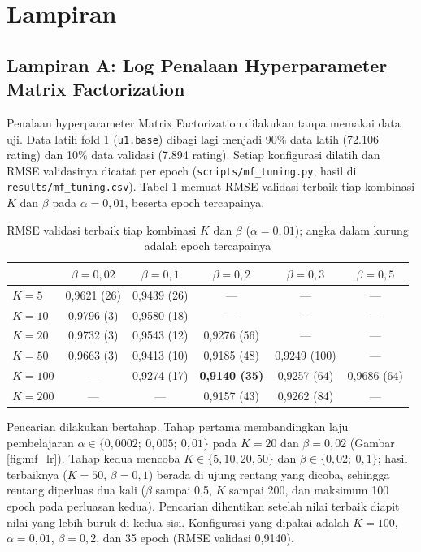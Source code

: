 \chapter*{Lampiran}
\section*{Lampiran A: Log Penalaan Hyperparameter Matrix Factorization}

Penalaan hyperparameter Matrix Factorization dilakukan tanpa memakai data uji. Data latih fold 1 (\texttt{u1.base}) dibagi lagi menjadi 90\% data latih (72.106 rating) dan 10\% data validasi (7.894 rating). Setiap konfigurasi dilatih dan RMSE validasinya dicatat per epoch (\texttt{scripts/mf\_tuning.py}, hasil di \texttt{results/mf\_tuning.csv}). Tabel \ref{tab:lampiran_tuning} memuat RMSE validasi terbaik tiap kombinasi $K$ dan $\beta$ pada $\alpha = 0,01$, beserta epoch tercapainya.

\begin{table}[htbp]
\centering
\caption{RMSE validasi terbaik tiap kombinasi $K$ dan $\beta$ ($\alpha = 0,01$); angka dalam kurung adalah epoch tercapainya}
\label{tab:lampiran_tuning}
\footnotesize
\setlength{\tabcolsep}{4pt}
\begin{tabular}{l c c c c c}
\toprule
 & $\beta = 0,02$ & $\beta = 0,1$ & $\beta = 0,2$ & $\beta = 0,3$ & $\beta = 0,5$ \\
\midrule
$K = 5$   & 0,9621 (26) & 0,9439 (26) & --- & --- & --- \\
$K = 10$  & 0,9796 (3)  & 0,9580 (18) & --- & --- & --- \\
$K = 20$  & 0,9732 (3)  & 0,9543 (12) & 0,9276 (56) & --- & --- \\
$K = 50$  & 0,9663 (3)  & 0,9413 (10) & 0,9185 (48) & 0,9249 (100) & --- \\
$K = 100$ & ---         & 0,9274 (17) & \textbf{0,9140 (35)} & 0,9257 (64) & 0,9686 (64) \\
$K = 200$ & ---         & ---         & 0,9157 (43) & 0,9262 (84) & --- \\
\bottomrule
\end{tabular}
\end{table}

Pencarian dilakukan bertahap. Tahap pertama membandingkan laju pembelajaran $\alpha \in \{0,0002;\ 0,005;\ 0,01\}$ pada $K=20$ dan $\beta=0,02$ (Gambar \ref{fig:mf_lr}). Tahap kedua mencoba $K \in \{5, 10, 20, 50\}$ dan $\beta \in \{0,02;\ 0,1\}$; hasil terbaiknya ($K=50$, $\beta=0,1$) berada di ujung rentang yang dicoba, sehingga rentang diperluas dua kali ($\beta$ sampai 0,5, $K$ sampai 200, dan maksimum 100 epoch pada perluasan kedua). Pencarian dihentikan setelah nilai terbaik diapit nilai yang lebih buruk di kedua sisi. Konfigurasi yang dipakai adalah $K=100$, $\alpha=0,01$, $\beta=0,2$, dan 35 epoch (RMSE validasi 0,9140).

